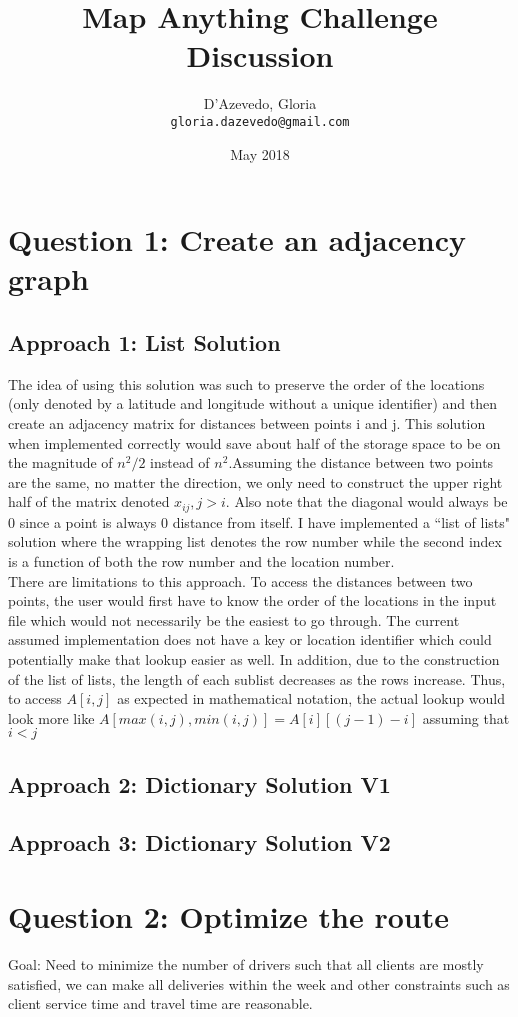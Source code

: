 \documentclass{article}
\title{Map Anything Challenge Discussion}
\author{
  D'Azevedo, Gloria\\
  \texttt{gloria.dazevedo@gmail.com}\\
}
\date{May 2018}
\begin{document}
\maketitle

\section{Question 1: Create an adjacency graph}
\subsection{Approach 1: List Solution}
The idea of using this solution was such to preserve the order of the locations (only denoted by a latitude and longitude without a unique identifier) and then create an adjacency matrix for distances between points i and j.  This solution when implemented correctly would save about half of the storage space to be on the magnitude of $n^2/2$ instead of $n^2$.Assuming the distance between two points are the same, no matter the direction, we only need to construct
the upper right half of the matrix denoted $x_{ij}, j>i$.  Also note that the diagonal would always be 0 since a point is always 0 distance from itself.  I have implemented a ``list of lists" solution where the wrapping list denotes the row number while the second index is a function of both the row number and the location number.  \\

There are limitations to this approach.  To access the distances between two points, the user would first have to know the order of the locations in the input file which would not necessarily be the easiest to go through.  The current assumed implementation does not have a key or location identifier which could potentially make that lookup easier as well.  In addition, due to the construction of the list of lists, the length of each sublist decreases as the rows increase.  Thus, to access $A[i,j]$ as expected in mathematical notation, the actual lookup would look more like $A[max(i,j),min(i,j)] = A[i][(j-1)-i]$ assuming that $i<j$


\subsection{Approach 2: Dictionary Solution V1}

\subsection{Approach 3: Dictionary Solution V2}

\section{Question 2: Optimize the route}
Goal: Need to minimize the number of drivers such that all clients are
mostly satisfied, we can make all deliveries within the week and other constraints
such as client service time and travel time are reasonable.
\end{document}
